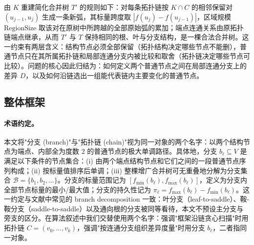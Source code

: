 \documentclass[twocolumn, a4paper, 10pt]{article}
\begin{document}
由 $K$ 重建简化合并树 $T'$ 的规则如下：对每条拓扑链按 $K\cap C$ 的相邻保留对 $(u_{j-1},u_j)$ 生成一条新弧，其标量跨度取 $|f(u_j)-f(u_{j-1})|$，区域规模 $\text{RegionSize}$ 取该对在原树中所跨越的全部原始弧的累加；端点连通关系由原拓扑链端点继承，从而 $T'$ 与 $T$ 保持相同的根、叶与分支结构，是一棵合法合并树。这一约束有两层含义：结构节点必须全部保留（拓扑结构决定哪些节点不能删），普通节点只在其所属拓扑链和局部连通分支内被比较和取舍（拓扑链决定哪些节点可比较）。问题的核心因此归结为：如何定义两个普通节点之间在局部连通分支上的差异 $D$，以及如何沿链选出一组能代表链内主要变化的普通节点。

\subsection{整体框架}

\paragraph{术语约定。}本文将"分支 (branch)"与"拓扑链 (chain)"视为同一对象的两个名字：以两个结构节点为端点、内部全为度数 $2$ 的普通节点的极大单调路径。具体地，分支 $b_\ell\subseteq V$ 是满足以下条件的节点集合：(i) 由两个端点结构节点和它们之间的一段普通节点序列构成；(ii) 按标量值排序后单调；(iii) 整棵增广合并树可无重叠地分解为分支集合 $\mathcal{B}=\{b_1,b_2,\ldots\}$。分支的标量范围记为 $[f_{\min}(b_\ell),f_{\max}(b_\ell)]$，定义为分支内全部节点标量的最小/最大值；分支的持久性记为 $\pi_\ell=f_{\max}(b_\ell)-f_{\min}(b_\ell)$。这一约定与文献中常见的 branch decomposition 一致：叶分支（leaf-to-saddle）、鞍-鞍分支（saddle-to-saddle）以及通向根的分支被同等看待，本文不预设主分支与旁支的区分。在算法叙述中我们交替使用两个名字：强调"框架沿链贪心扫描"时用拓扑链 $C=(v_0,\ldots,v_k)$，强调"按连通分支组织差异度量"时用分支 $b_\ell$，二者指同一对象。
\end{document}
